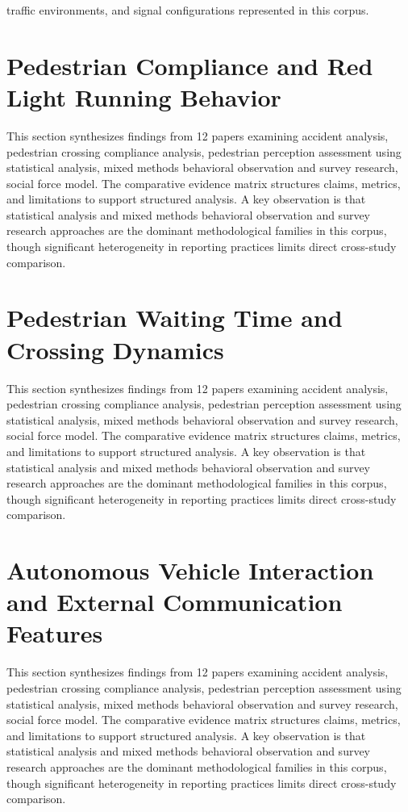 \documentclass{article}
\begin{document}
traffic environments, and signal configurations represented in this corpus.

\section{Pedestrian Compliance and Red Light Running Behavior}
This section synthesizes findings from 12 papers examining accident analysis, pedestrian crossing compliance analysis, pedestrian perception assessment using statistical analysis, mixed methods behavioral observation and survey research, social force model. The comparative evidence matrix structures claims, metrics, and limitations to support structured analysis. A key observation is that statistical analysis and mixed methods behavioral observation and survey research approaches are the dominant methodological families in this corpus, though significant heterogeneity in reporting practices limits direct cross-study comparison.

\section{Pedestrian Waiting Time and Crossing Dynamics}
This section synthesizes findings from 12 papers examining accident analysis, pedestrian crossing compliance analysis, pedestrian perception assessment using statistical analysis, mixed methods behavioral observation and survey research, social force model. The comparative evidence matrix structures claims, metrics, and limitations to support structured analysis. A key observation is that statistical analysis and mixed methods behavioral observation and survey research approaches are the dominant methodological families in this corpus, though significant heterogeneity in reporting practices limits direct cross-study comparison.

\section{Autonomous Vehicle Interaction and External Communication Features}
This section synthesizes findings from 12 papers examining accident analysis, pedestrian crossing compliance analysis, pedestrian perception assessment using statistical analysis, mixed methods behavioral observation and survey research, social force model. The comparative evidence matrix structures claims, metrics, and limitations to support structured analysis. A key observation is that statistical analysis and mixed methods behavioral observation and survey research approaches are the dominant methodological families in this corpus, though significant heterogeneity in reporting practices limits direct cross-study comparison.
\end{document}
